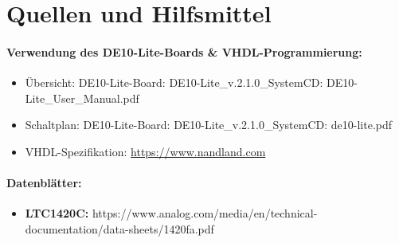 \section{Quellen und Hilfsmittel}
\paragraph{Verwendung des DE10-Lite-Boards \& VHDL-Programmierung:}
\begin{itemize}
\item
Übersicht: DE10-Lite-Board: DE10-Lite\_v.2.1.0\_SystemCD: DE10-Lite\_User\_Manual.pdf
\item
\label{Schaltplan_FPGA}
Schaltplan: DE10-Lite-Board: DE10-Lite\_v.2.1.0\_SystemCD: de10-lite.pdf
\item
VHDL-Spezifikation: \url{https://www.nandland.com}
\end{itemize}
\paragraph{Datenblätter:}
\begin{itemize}
\item \label{LTC1420C_dat}
\textbf{LTC1420C:} https://www.analog.com/media/en/technical-documentation/data-sheets/1420fa.pdf
\end{itemize}